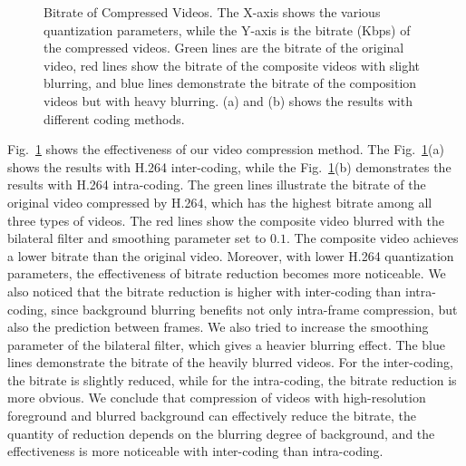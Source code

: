 \begin{figure}
	\centering
	\caption{Bitrate of Compressed Videos. The X-axis shows the various quantization parameters, while the Y-axis is the bitrate (Kbps) of the compressed videos. Green lines are the bitrate of the original video, red lines show the bitrate of the composite videos with slight blurring, and blue lines demonstrate the bitrate of the composition videos but with heavy blurring. (a) and (b) shows the results with different coding methods.} 
	\label{fig-comp-br}
\end{figure}

Fig.~\ref{fig-comp-br} shows the effectiveness of our video compression method. The Fig.~\ref{fig-comp-br}(a) shows the results with H.264 inter-coding, while the Fig.~\ref{fig-comp-br}(b) demonstrates the results with H.264 intra-coding. The green lines illustrate the bitrate of the original video compressed by H.264, which has the highest bitrate among all three types of videos. The red lines show the composite video blurred with the bilateral filter and smoothing parameter set to $0.1$. The composite video achieves a lower bitrate than the original video. Moreover, with lower H.264 quantization parameters, the effectiveness of bitrate reduction becomes more noticeable. We also noticed that the bitrate reduction is higher with inter-coding than intra-coding, since background blurring benefits not only intra-frame compression, but also the prediction between frames. We also tried to increase the smoothing parameter of the bilateral filter, which gives a heavier blurring effect. The blue lines demonstrate the bitrate of the heavily blurred videos. For the inter-coding, the bitrate is slightly reduced, while for the intra-coding, the bitrate reduction is more obvious. We conclude that compression of videos with high-resolution foreground and blurred background can effectively reduce the bitrate, the quantity of reduction depends on the blurring degree of background, and the effectiveness is more noticeable with inter-coding than intra-coding.
